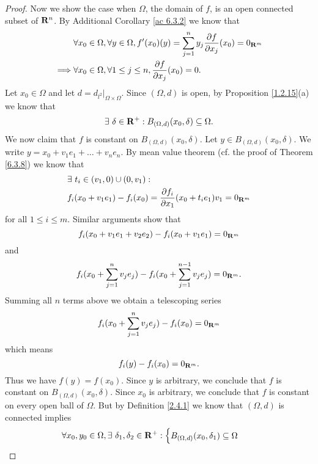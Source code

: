 \begin{proof}
    Now we show the case when \(\Omega\), the domain of \(f\), is an open connected subset of \(\mathbf{R}^n\).
    By Additional Corollary \ref{ac 6.3.2} we know that
    \begin{align*}
                 & \forall x_0 \in \Omega, \forall y \in \Omega, f'(x_0)(y) = \sum_{j = 1}^n y_j \frac{\partial f}{\partial x_j}(x_0) = 0_{\mathbf{R}^m} \\
        \implies & \forall x_0 \in \Omega, \forall 1 \leq j \leq n, \frac{\partial f}{\partial x_j}(x_0) = 0.
    \end{align*}
    Let \(x_0 \in \Omega\) and let \(d = d_{l^2}|_{\Omega \times \Omega}\).
    Since \((\Omega, d)\) is open, by Proposition \ref{1.2.15}(a) we know that
    \[
        \exists\ \delta \in \mathbf{R}^+ : B_{(\Omega, d)}(x_0, \delta) \subseteq \Omega.
    \]
    We now claim that \(f\) is constant on \(B_{(\Omega, d)}(x_0, \delta)\).
    Let \(y \in B_{(\Omega, d)}(x_0, \delta)\).
    We write \(y = x_0 + v_1 e_1 + \dots + v_n e_n\).
    By mean value theorem (cf. the proof of Theorem \ref{6.3.8}) we know that
    \begin{align*}
         & \exists\ t_i \in (v_1, 0) \cup (0, v_1) :                                                       \\
         & f_i(x_0 + v_1 e_1) - f_i(x_0) = \frac{\partial f_i}{\partial x_1}(x_0 + t_i e_1) v_1 = 0_{\mathbf{R}^m}
    \end{align*}
    for all \(1 \leq i \leq m\).
    Similar arguments show that
    \[
        f_i(x_0 + v_1 e_1 + v_2 e_2) - f_i(x_0 + v_1 e_1) = 0_{\mathbf{R}^m}
    \]
    and
    \[
        f_i(x_0 + \sum_{j = 1}^n v_j e_j) - f_i(x_0 + \sum_{j = 1}^{n - 1} v_j e_j) = 0_{\mathbf{R}^m}.
    \]
    Summing all \(n\) terms above we obtain a telescoping series
    \[
        f_i(x_0 + \sum_{j = 1}^n v_j e_j) - f_i(x_0) = 0_{\mathbf{R}^m}
    \]
    which means
    \[
        f_i(y) - f_i(x_0) = 0_{\mathbf{R}^m}.
    \]
    Thus we have \(f(y) = f(x_0)\).
    Since \(y\) is arbitrary, we conclude that \(f\) is constant on \(B_{(\Omega, d)}(x_0, \delta)\).
    Since \(x_0\) is arbitrary, we conclude that \(f\) is constant on every open ball of \(\Omega\).
    But by Definition \ref{2.4.1} we know that \((\Omega, d)\) is connected implies
    \begin{align*}
                 & \forall x_0, y_0 \in \Omega, \exists\ \delta_1, \delta_2 \in \mathbf{R}^+ : \begin{cases}
                                                                                           B_{(\Omega, d)}(x_0, \delta_1) \subseteq \Omega \\

\end{cases}
\end{align*}
\end{proof}
